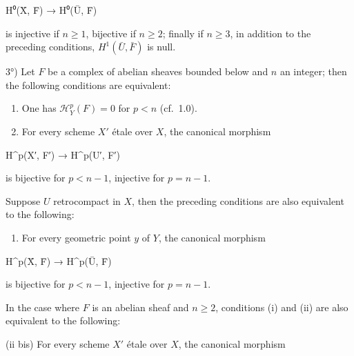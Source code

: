 \documentclass[
  11pt,
  a4paper,
]{book}
\newenvironment{Shaded}{}{}
\newcommand{\NormalTok}[1]{#1}
\providecommand{\tightlist}{%
  \setlength{\itemsep}{0pt}\setlength{\parskip}{0pt}}
\begin{document}
\begin{Shaded}
\begin{Highlighting}[]
\NormalTok{H⁰(X̄, F̄) → H⁰(Ū, F̄)}
\end{Highlighting}
\end{Shaded}

is injective if \(n \geqslant 1\), bijective if \(n \geqslant 2\);
finally if \(n \geqslant 3\), in addition to the preceding conditions,
\(H^{1}(\bar{U}, \bar{F})\) is null.

3°) Let \(F\) be a complex of abelian sheaves bounded below and \(n\) an
integer; then the following conditions are equivalent:

\begin{enumerate}
\def\labelenumi{(\roman{enumi})}
\item
  One has \(\mathcal{H}^{p}_{Y}(F) = 0\) for \(p < n\) (cf.~1.0).
\item
  For every scheme \(X'\) étale over \(X\), the canonical morphism
\end{enumerate}

\begin{Shaded}
\begin{Highlighting}[]
\NormalTok{H\^{}p(X′, F′) → H\^{}p(U′, F′)}
\end{Highlighting}
\end{Shaded}

is bijective for \(p < n - 1\), injective for \(p = n - 1\).

Suppose \(U\) retrocompact in \(X\), then the preceding conditions are
also equivalent to the following:

\begin{enumerate}
\def\labelenumi{(\roman{enumi})}
\setcounter{enumi}{2}
\tightlist
\item
  For every geometric point \(y\) of \(Y\), the canonical morphism
\end{enumerate}

\begin{Shaded}
\begin{Highlighting}[]
\NormalTok{H\^{}p(X̄, F̄) → H\^{}p(Ū, F̄)}
\end{Highlighting}
\end{Shaded}

is bijective for \(p < n - 1\), injective for \(p = n - 1\).

In the case where \(F\) is an abelian sheaf and \(n \geqslant 2\),
conditions (i) and (ii) are also equivalent to the following:

(ii bis) For every scheme \(X'\) étale over \(X\), the canonical
morphism
\end{document}
